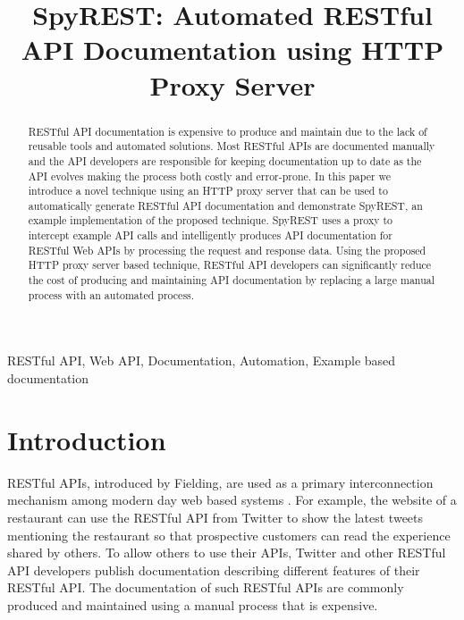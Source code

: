 \documentclass[conference]{IEEEtran}
\begin{document}
\title{SpyREST: Automated RESTful API Documentation using HTTP Proxy Server}


\author{
}
\maketitle


\begin{abstract}
RESTful API documentation is expensive to produce and maintain due to the lack of reusable tools and automated solutions. Most RESTful APIs are documented manually and the API developers are responsible for keeping documentation up to date as the API evolves making the process both costly and error-prone. In this paper we introduce a novel technique using an HTTP proxy server that can be used to automatically generate RESTful API documentation and demonstrate SpyREST, an example implementation of the proposed technique. SpyREST uses a proxy to intercept example API calls and intelligently produces API documentation for RESTful Web APIs by processing the request and response data. Using the proposed HTTP proxy server based technique, RESTful API developers can significantly reduce the cost of producing and maintaining API documentation by replacing a large manual process with an automated process.
\end{abstract}

\IEEEpeerreviewmaketitle

\begin{IEEEkeywords}
RESTful API, Web API, Documentation, Automation, Example based documentation
\end{IEEEkeywords}


\section{Introduction}
RESTful APIs, introduced by Fielding, are used as a primary interconnection mechanism among modern day web based systems \cite{Fielding_rest}. For example, the website of a restaurant can use the RESTful API from Twitter to show the latest tweets mentioning the restaurant so that prospective customers can read the experience shared by others. To allow others to use their APIs, Twitter and other RESTful API developers publish documentation describing different features of their RESTful API. The documentation of such RESTful APIs are commonly produced and maintained using a manual process that is expensive.
\end{document}
